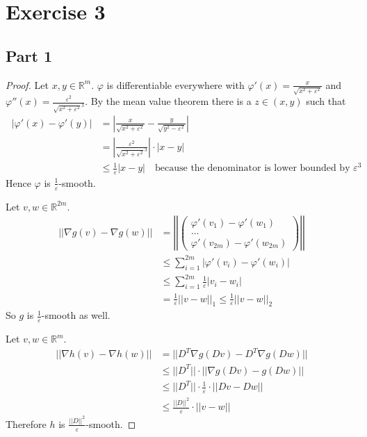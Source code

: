 \documentclass[10pt,a4paper]{article}
\begin{document}
\section*{Exercise 3}

\subsection*{Part 1}

\begin{proof}
  Let $x, y \in \mathbb{R}^{m}$.
  $\varphi$ is differentiable everywhere with $\varphi'(x) = \frac{x}{\sqrt{x^{2} + \varepsilon^{2}}}$ and $\varphi''(x) = \frac{\varepsilon^{2}}{\sqrt{x^{2} + \varepsilon^{2}}^{3}}$.
  By the mean value theorem there is a $z \in (x, y)$ such that
  \begin{align*}
    ~|\varphi'(x) - \varphi'(y)| & = \left| \frac{x}{\sqrt{x^{2} + \varepsilon^{2}}} - \frac{y}{\sqrt{y^{2} - \varepsilon^{2}}} \right|\\
                                 & = \left| \frac{\varepsilon^{2}}{\sqrt{x^{2} + \varepsilon^{2}}^{3}} \right| \cdot |x - y|\\
                                 & \le \frac{1}{\varepsilon}|x - y| \quad \text{because the denominator is lower bounded by $\varepsilon^3$}
  \end{align*}
  Hence $\varphi$ is $\frac{1}{\varepsilon}$-smooth.

  Let $v, w \in \mathbb{R}^{2m}$.
  \begin{align*}
    ~||\nabla g(v) - \nabla g(w)|| & = \left|\left| \begin{pmatrix}\varphi'(v_{1}) - \varphi'(w_{1})\\\hdots\\\varphi'(v_{2m}) - \varphi'(w_{2m})\end{pmatrix} \right|\right|\\
                                   & \le \sum_{i = 1}^{2m} |\varphi'(v_{i}) - \varphi'(w_{i})|\\
                                   & \le \sum_{i = 1}^{2m} \frac{1}{\varepsilon}|v_{i} - w_{i}|\\
                                   & = \frac{1}{\varepsilon}||v - w||_{1} \le \frac{1}{\varepsilon}||v - w||_{2}
  \end{align*}
  So $g$ is $\frac{1}{\varepsilon}$-smooth as well.

  Let $v, w \in \mathbb{R}^{m}$.
  \begin{align*}
    ~||\nabla h(v) - \nabla h(w)|| & = ||D^{T}\nabla g(Dv) - D^{T}\nabla g(Dw)||\\
                                   & \le ||D^{T}|| \cdot ||\nabla g(Dv) - g(Dw)||\\
                                   & \le ||D^{T}|| \cdot \frac{1}{\varepsilon} \cdot ||Dv - Dw||\\
                                   & \le \frac{||D||^{2}}{\varepsilon} \cdot ||v - w||
  \end{align*}
  Therefore $h$ is $\frac{||D||^{2}}{\varepsilon}$-smooth.


\end{proof}
\end{document}
